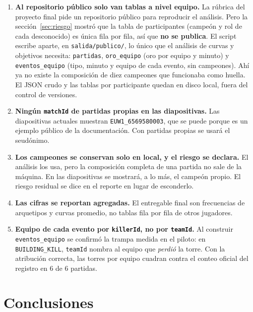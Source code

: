 \documentclass[11pt,letterpaper]{article}
\begin{document}
\begin{enumerate}[leftmargin=1.6em,itemsep=.35em]
  \item \textbf{Al repositorio público solo van tablas a nivel equipo.} La rúbrica del
        proyecto final pide un repositorio público para reproducir el análisis. Pero
        la sección~\ref{sec:riesgo} mostró que la tabla de participantes (campeón y
        rol de cada desconocido) es única fila por fila, así que \textbf{no se
        publica}. El script escribe aparte, en \texttt{salida/publico/}, lo único que
        el análisis de curvas y objetivos necesita: \texttt{partidas},
        \texttt{oro\_equipo} (oro por equipo y minuto) y \texttt{eventos\_equipo}
        (tipo, minuto y equipo de cada evento, sin campeones). Ahí ya no existe la
        composición de diez campeones que funcionaba como huella. El JSON crudo y las
        tablas por participante quedan en disco local, fuera del control de
        versiones.
  \item \textbf{Ningún \texttt{matchId} de partidas propias en las diapositivas.}
        Las diapositivas actuales muestran \texttt{EUW1\_6569580003}, que se puede
        porque es un ejemplo público de la documentación. Con partidas propias se
        usará el seudónimo.
  \item \textbf{Los campeones se conservan solo en local, y el riesgo se declara.} El
        análisis los usa, pero la composición completa de una partida no sale de la
        máquina. En las diapositivas se mostrará, a lo más, el campeón propio. El
        riesgo residual se dice en el reporte en lugar de esconderlo.
  \item \textbf{Las cifras se reportan agregadas.} El entregable final son
        frecuencias de arquetipos y curvas promedio, no tablas fila por fila de
        otros jugadores.
  \item \textbf{Equipo de cada evento por \texttt{killerId}, no por \texttt{teamId}.}
        Al construir \texttt{eventos\_equipo} se confirmó la trampa medida en el
        piloto: en \texttt{BUILDING\_KILL}, \texttt{teamId} nombra al equipo que
        \emph{perdió} la torre. Con la atribución correcta, las torres por equipo
        cuadran contra el conteo oficial del registro en 6 de 6 partidas.
\end{enumerate}

\section{Conclusiones}
\end{document}

